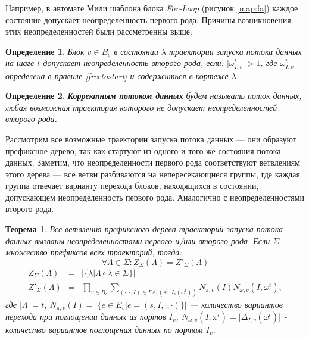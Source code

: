 \documentclass[10pt,a4paper]{article}
\newtheorem{defen}{Определение}
\newtheorem{theorem}{Теорема}
\newcommand{\FA}{F\!A}
\begin{document}
  Например, в автомате Мили шаблона блока \textit{For-Loop} (рисунок \ref{map:fa}) каждое состояние допускает неопределенность первого рода.
  Причины возникновения этих неопределенностей были рассметренны выше.
 
  \begin{defen}
    Блок $v \in B_c$ в состоянии $\lambda$ траектории запуска потока данных на шаге $t$ допускает неопределенность второго рода, если:
    $\lvert \omega^t_{I, v} \rvert > 1$, где $\omega^t_{I, v}$ определена в правиле \eqref{freetostart} и содержиться в кортеже $\lambda$.
  \end{defen}
  
  \begin{defen}
    \textbf{Корректным потоком данных} будем называть поток данных, любая возможная траектория которого не допускает неопределенностей второго рода.
  \end{defen}
  
  Рассмотрим все возможные траектории запуска потока данных --- они образуют префиксное дерево, так как стартуют из одного и того же состояния потока данных.
  Заметим, что неопределенности первого рода соответствуют ветвлениям этого дерева --- все ветви разбиваются на непересекающиеся группы, где каждая группа отвечает варианту перехода блоков,
  находящихся в состоянии, допускающем неопределенность первого рода. Аналогично с неопределенностями второго рода.
  
  \begin{theorem}
    Все ветвления префиксного дерева траекторий запуска потока данных вызваны неопределенностями первого и/или второго рода.
    Если $\Sigma$ --- множество префиксов всех траекторий, тогда:
    $$\forall \Lambda \in \Sigma: Z_{\Sigma}(\Lambda) = {Z'}_{\Sigma}(\Lambda)$$
    \begin{eqnarray*}
      Z_{\Sigma}(\Lambda) & = & \lvert \{ \lambda \vert \Lambda\circ\lambda \in \Sigma \} \rvert\\
      Z'_{\Sigma}(\Lambda) & = & \prod_{v \in B_c} \sum_{(\cdot, \cdot, I) \in \FA_v(s^{t}_v, I_v(\omega^t))} N_{\pi, v}(I) N_{\omega, v}(I, \omega^t),
    \end{eqnarray*}
    где $\lvert \Lambda \rvert = t$, $N_{\pi, v}(I) = \lvert \{ e \in E_v \vert e = (s, I, \cdot, \cdot) \} \rvert$ --- количество вариантов перехода при поглощении данных из портов $I_v$,
    $N_{\omega, v}(I, \omega^t) = \lvert \Delta_{I, v}(\omega^t) \rvert$ - количество вариантов поглощения данных по портам $I_v$.
  \end{theorem}
  
\end{document}
